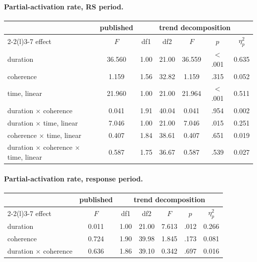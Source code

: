 \paragraph{Partial-activation rate, RS period.}
\begin{center}\small
\begin{tabular}{lcccccc}
\toprule
 & \multicolumn{1}{c}{published} & \multicolumn{5}{c}{trend decomposition}\\
\cmidrule(lr){2-2}\cmidrule(l){3-7}
effect & $F$ & df1 & df2 & $F$ & $p$ & $\eta_p^2$\\
\midrule
duration & 36.560 & 1.00 & 21.00 & 36.559 & $<$.001 & 0.635\\
coherence & 1.159 & 1.56 & 32.82 & 1.159 & .315 & 0.052\\
time, linear & 21.960 & 1.00 & 21.00 & 21.964 & $<$.001 & 0.511\\
duration $\times$ coherence & 0.041 & 1.91 & 40.04 & 0.041 & .954 & 0.002\\
duration $\times$ time, linear & 7.046 & 1.00 & 21.00 & 7.046 & .015 & 0.251\\
coherence $\times$ time, linear & 0.407 & 1.84 & 38.61 & 0.407 & .651 & 0.019\\
duration $\times$ coherence $\times$ time, linear & 0.587 & 1.75 & 36.67 & 0.587 & .539 & 0.027\\
\bottomrule
\end{tabular}
\end{center}

\paragraph{Partial-activation rate, response period.}
\begin{center}\small
\begin{tabular}{lcccccc}
\toprule
 & \multicolumn{1}{c}{published} & \multicolumn{5}{c}{trend decomposition}\\
\cmidrule(lr){2-2}\cmidrule(l){3-7}
effect & $F$ & df1 & df2 & $F$ & $p$ & $\eta_p^2$\\
\midrule
duration & 0.011 & 1.00 & 21.00 & 7.613 & .012 & 0.266\\
coherence & 0.724 & 1.90 & 39.98 & 1.845 & .173 & 0.081\\
duration $\times$ coherence & 0.636 & 1.86 & 39.10 & 0.342 & .697 & 0.016\\
\bottomrule
\end{tabular}
\end{center}

